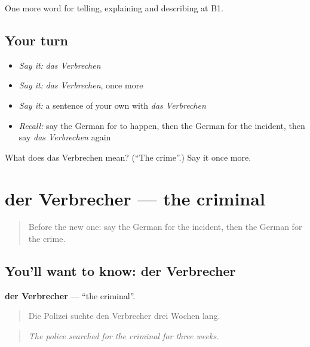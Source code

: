 \begin{grammarlens}[title={What you've built}]
One more word for telling, explaining and describing at B1.
\end{grammarlens}

\subsection*{Your turn}
\begin{itemize}
\raggedright
  \item \emph{Say it:} \emph{das Verbrechen}
  \item \emph{Say it:} \emph{das Verbrechen}, once more
  \item \emph{Say it:} a sentence of your own with \emph{das Verbrechen}
  \item \emph{Recall:} say the German for to happen, then the German for the incident, then say \emph{das Verbrechen} again
\end{itemize}

\begin{tcolorbox}[breakable,colback=teal!4,colframe=teal!35!black,title={Before you move on}]
What does das Verbrechen mean? (\textquotedblleft{}The crime\textquotedblright{}.) Say it once more.
\end{tcolorbox}
\section[der Verbrecher]{der Verbrecher — the criminal}

\label{lesson:GE-C280-verbrecher}



\begin{quote}
Before the new one: say the German for the incident, then the German for the crime.
\end{quote}

\subsection*{You'll want to know: der Verbrecher}
\textbf{der Verbrecher} — \textquotedblleft{}the criminal\textquotedblright{}.

\begin{quote}
Die Polizei suchte den Verbrecher drei Wochen lang.
\end{quote}

\begin{quote}
\emph{The police searched for the criminal for three weeks.}
\end{quote}

